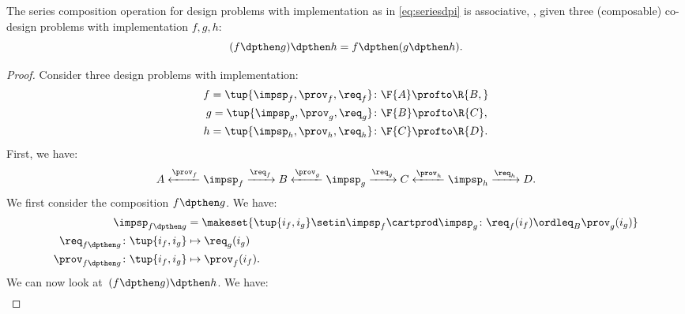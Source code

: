 {    \begin{lemma}\label{lem:dpi-series}
        The series composition operation for design problems with implementation as in \cref{eq:seriesdpi} is associative, \ie,  given three (composable) co-design problems with implementation $f,g,h$:
        \begin{equation}
            (f\dpthen g)
            \dpthen h = f\dpthen (g\dpthen h).
        \end{equation}
    \end{lemma}
    \begin{proof}
        Consider three design problems with implementation:
        \begin{equation}
            \begin{aligned}
                f=\tup{{\impsp_f, \prov_f, \req_f} } & \colon \F{A} \profto\R{B,} \\
                g=\tup{\impsp_g, \prov_g, \req_g}    & \colon \F{B} \profto \R{C}, \\
                h=\tup{\impsp_h, \prov_h, \req_h}    & \colon \F{C} \profto \R{D}.
            \end{aligned}
        \end{equation}
        First, we have:
        \begin{equation}
            A \xleftarrow{\prov_f} \impsp_f \xrightarrow{\req_f} B
            \xleftarrow{\prov_g} \impsp_g \xrightarrow{\req_g} C
            \xleftarrow{\prov_h} \impsp_h \xrightarrow{\req_h} D.
        \end{equation}
        We first consider the composition $f\dpthen g$.
        We have:
        \begin{equation}
            \begin{aligned}
                \impsp_{f\dpthen g}                       & = \makeset{
                    \tup{i_f,i_g} \setin \impsp_f \cartprod \impsp_g \colon
                    \req_f(i_f) \ordleq_{B} \prov_g(i_g)
                } \\
                \req_{f\dpthen g}  \colon  \tup{i_f,i_g}  & \mapsto \req_g(i_g) \\
                \prov_{f\dpthen g}  \colon  \tup{i_f,i_g} & \mapsto \prov_f(i_f).
            \end{aligned}
        \end{equation}
        We can now look at~$(f\dpthen g)\dpthen h$.
        We have:
        \begin{equation}
            \begin{aligned}

\end{aligned}
\end{equation}
\end{proof}}
